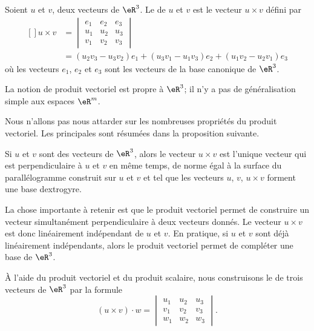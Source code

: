 \begin{definition}      \label{DEFooTNTNooRjhuJZ}
	Soient $u$ et $v$, deux vecteurs de $\eR^3$. Le  de $u$ et $v$ est le vecteur $u\times v$ défini par 
	\begin{equation}
		\begin{aligned}[]
		u\times v&=\begin{vmatrix}
			e_1	&	e_2	&	e_3	\\
			u_1	&	u_2	&	u_3	\\
			v_1	&	v_2	&	v_3
		\end{vmatrix}\\
		&=
		(u_2v_3-u_3v_2)e_1+(u_3v_1-u_1v_3)e_2+(u_1v_2-u_2v_1)e_3
		\end{aligned}
	\end{equation}
	où les vecteurs $e_1$, $e_2$ et $e_3$ sont les vecteurs de la base canonique de $\eR^3$.
\end{definition}
La notion de produit vectoriel est propre à $\eR^3$; il n'y a pas de généralisation simple aux espaces $\eR^m$.

Nous n'allons pas nous attarder sur les nombreuses propriétés du produit vectoriel. Les principales sont résumées dans la proposition suivante.
\begin{proposition}
	Si $u$ et $v$ sont des vecteurs de $\eR^3$, alors le vecteur $u\times v$ est l'unique vecteur qui est perpendiculaire à $u$ et $v$ en même temps, de norme égal à la surface du parallélogramme construit sur $u$ et $v$ et tel que les vecteurs $u$, $v$, $u\times v$ forment une base dextrogyre.
\end{proposition}
La chose importante à retenir est que le produit vectoriel permet de construire un vecteur simultanément perpendiculaire à deux vecteurs donnés. Le vecteur $u\times v$ est donc linéairement indépendant de $u$ et $v$. En pratique, si $u$ et $v$ sont déjà linéairement indépendants, alors le produit vectoriel permet de compléter une base de $\eR^3$.

À l'aide du produit vectoriel et du produit scalaire, nous construisons le  de trois vecteurs de $\eR^3$ par la formule
\begin{equation}
	(u\times v)\cdot w=\begin{vmatrix}
			u_1	&	u_2	&	u_3	\\
			v_1	&	v_2	&	v_3	\\
			w_1	&	w_2	&	w_3	
	\end{vmatrix}.
\end{equation}

